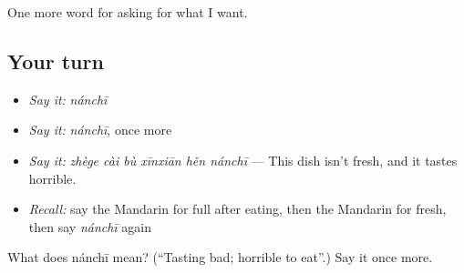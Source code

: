 \begin{grammarlens}[title={What you've built}]
One more word for asking for what I want.
\end{grammarlens}

\subsection*{Your turn}
\begin{itemize}
\raggedright
  \item \emph{Say it:} \emph{nánchī}
  \item \emph{Say it:} \emph{nánchī}, once more
  \item \emph{Say it:} \emph{zhège cài bù xīnxiān hěn nánchī} — This dish isn't fresh, and it tastes horrible.
  \item \emph{Recall:} say the Mandarin for full after eating, then the Mandarin for fresh, then say \emph{nánchī} again
\end{itemize}

\begin{tcolorbox}[breakable,colback=teal!4,colframe=teal!35!black,title={Before you move on}]
What does nánchī mean? (\textquotedblleft{}Tasting bad; horrible to eat\textquotedblright{}.) Say it once more.
\end{tcolorbox}
